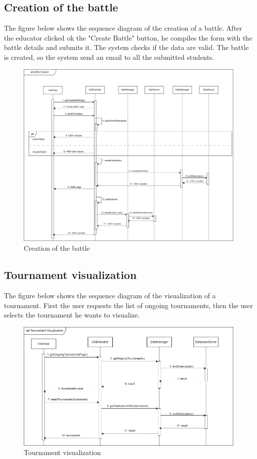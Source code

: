 \subsection{Creation of the battle}
The figure below shows the sequence diagram of the creation of a battle. After the educator clicked ok the "Create Battle" button, he compiles the form
 with the battle details and submits it. The system checks if the data are valid. The battle is created, so the system send an email to all 
 the submitted students.  
 
\begin{figure}[H]
    \centering
    \includegraphics[width=1\textwidth]{images/seq_diagrams/battle_creation_DD.png}
    \caption{Creation of the battle}
\end{figure}

\subsection{Tournament visualization}
The figure below shows the sequence diagram of the visualization of a tournament. First the user requests the list of ongoing tournaments, 
then the user selects the tournament he wants to visualize.\\
\begin{figure}[H]
    \centering
    \includegraphics[width=1\textwidth]{images/seq_diagrams/tournament_visualization_dd.png}
    \caption{Tournament visualization}
\end{figure}

